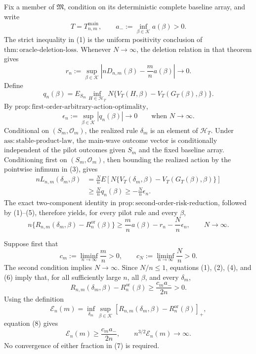 Fix a member of \(\mathfrak M\), condition on its deterministic complete baseline array, and write
\[
T=T_{n,m}^{\mathrm{main}},
\qquad
a_-:=\inf_{\beta\in\mathcal K}a(\beta)>0.
\tag{1}
\]
The strict inequality in (1) is the uniform positivity conclusion of \(\mathrm{thm{:}oracle\text{-}deletion\text{-}loss}\).  Whenever \(N\to\infty\), the deletion relation in that theorem gives
\[
r_n:=\sup_{\beta\in\mathcal K}
\left|nD_{n,m}(\beta)-\frac mn a(\beta)\right|
\longrightarrow0.
\tag{2}
\]
Define
\[
q_n(\beta)=E_{S_m}\inf_{H\in\mathcal H_T}
N\{V_T(H,\beta)-V_T(G_T(\beta),\beta)\}.
\tag{3}
\]
By \(\mathrm{prop{:}first\text{-}order\text{-}arbitrary\text{-}action\text{-}optimality}\),
\[
\epsilon_n:=\sup_{\beta\in\mathcal K}|q_n(\beta)|
\longrightarrow0
\qquad\text{when }N\to\infty.
\tag{4}
\]
Conditional on \((S_m,\mathcal O_m)\), the realized rule \(\delta_m\) is an element of \(\mathcal H_T\).  Under \(\mathrm{ass{:}stable\text{-}product\text{-}law}\), the main-wave outcome vector is conditionally independent of the pilot outcomes given \(S_m\) and the fixed baseline array.  Conditioning first on \((S_m,\mathcal O_m)\), then bounding the realized action by the pointwise infimum in (3), gives
\[
\begin{aligned}
nL_{n,m}(\delta_m,\beta)
&=\frac Nn E\!\left[
N\{V_T(\delta_m,\beta)-V_T(G_T(\beta),\beta)\}
\right]\\
&\geq\frac Nn q_n(\beta)
\geq-\frac Nn\epsilon_n.
\end{aligned}
\tag{5}
\]
The exact two-component identity in \(\mathrm{prop{:}second\text{-}order\text{-}risk\text{-}reduction}\), followed by (1)--(5), therefore yields, for every pilot rule and every \(\beta\),
\[
n\{R_{n,m}(\delta_m,\beta)-R_n^{\mathrm{or}}(\beta)\}
\geq\frac mn a(\beta)-r_n-\frac Nn\epsilon_n,
\qquad N\to\infty.
\tag{6}
\]

Suppose first that
\[
c_m:=\liminf_{n\to\infty}\frac mn>0,
\qquad
c_N:=\liminf_{n\to\infty}\frac Nn>0.
\tag{7}
\]
The second condition implies \(N\to\infty\).  Since \(N/n\leq1\), equations (1), (2), (4), and (6) imply that, for all sufficiently large \(n\), all \(\beta\), and every \(\delta_m\),
\[
R_{n,m}(\delta_m,\beta)-R_n^{\mathrm{or}}(\beta)
\geq\frac{c_m a_-}{2n}>0.
\tag{8}
\]
Using the definition
\[
\mathcal E_n(m)=\inf_{\delta_m}\sup_{\beta\in\mathcal K}
[R_{n,m}(\delta_m,\beta)-R_n^{\mathrm{or}}(\beta)]_+,
\tag{9}
\]
equation (8) gives
\[
\mathcal E_n(m)\geq\frac{c_m a_-}{2n},
\qquad
n^{3/2}\mathcal E_n(m)\longrightarrow\infty.
\tag{10}
\]
No convergence of either fraction in (7) is required.

